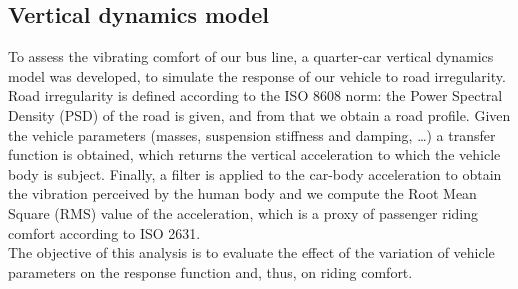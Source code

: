 \documentclass{article}
\begin{document}
\subsection{Vertical dynamics model}
To assess the vibrating comfort of our bus line, a quarter-car vertical dynamics model was developed, to simulate the response of our vehicle to road irregularity. Road irregularity is defined according to the ISO 8608 norm: the Power Spectral Density (PSD) of the road is given, and from that we obtain a road profile. Given the vehicle parameters (masses, suspension stiffness and damping, …) a transfer function is obtained, which returns the vertical acceleration to which the vehicle body is subject. Finally, a filter is applied to the car-body acceleration to obtain the vibration perceived by the human body and we compute the Root Mean Square (RMS) value of the acceleration, which is a proxy of passenger riding comfort according to ISO 2631.\\
The objective of this analysis is to evaluate the effect of the variation of vehicle parameters on the response function and, thus, on riding comfort.\\
\end{document}

